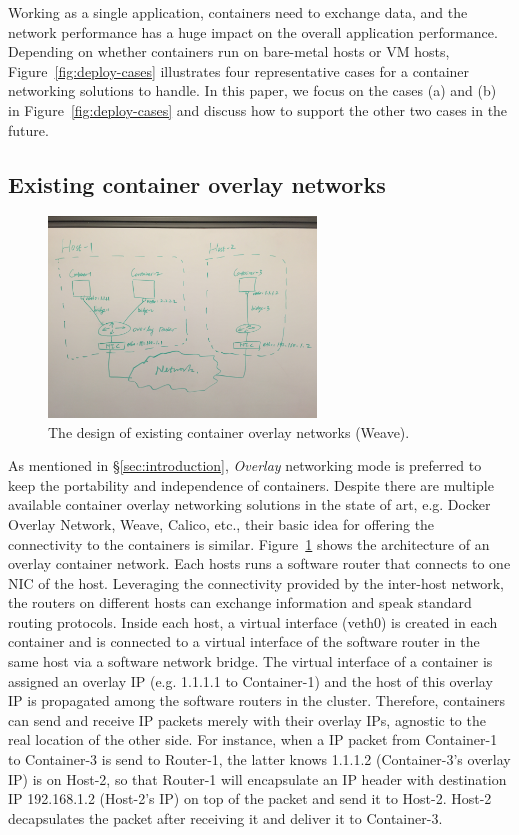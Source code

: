 Working as a single application, containers need to exchange data, and the network performance has a huge impact on the overall application performance.
Depending on whether 
containers run on bare-metal hosts or VM hosts, Figure~\ref{fig:deploy-cases}
illustrates four representative cases for a container networking solutions
to handle. 
In this paper, 
we focus on the cases (a) and (b) in Figure~\ref{fig:deploy-cases} and discuss how to support the other two cases in the future.

\subsection{Existing container overlay networks}

\begin{figure}[h]  
	\centering   
	\includegraphics[width=2.8in]{figures/overlay-sketch}   
	\caption{\label{fig:overlay} The design of existing container overlay networks (Weave).}   
\end{figure}   

As mentioned in \S\ref{sec:introduction}, {\em Overlay} networking mode 
is preferred to keep the portability and independence of containers.
Despite there are multiple available container overlay networking solutions
in the state of art, e.g. Docker Overlay Network, Weave, Calico, etc., 
their basic idea for offering the connectivity to the containers is similar.
Figure~\ref{fig:overlay} shows the architecture of an overlay container network.
Each hosts runs a software router that connects to one NIC of the host. 
Leveraging the connectivity provided by the inter-host network, the routers
on different hosts can exchange information and speak standard routing protocols.
Inside each host, a virtual interface (veth0) is created in each container and is connected to a virtual interface of the software router in the same host via a software network bridge. The virtual interface of a container is assigned
an overlay IP (e.g. 1.1.1.1 to Container-1) and the host of this overlay IP
is propagated among the software routers in the cluster. Therefore, containers
can send and receive IP packets merely with their overlay IPs, agnostic to
the real location of the other side. For instance, when a IP packet from
Container-1 to Container-3 is send to Router-1, the latter knows 1.1.1.2
(Container-3's overlay IP) is on Host-2, so that Router-1 will encapsulate 
an IP header with destination IP 192.168.1.2 (Host-2's IP) on top of the packet
and send it to Host-2. Host-2 decapsulates the packet after receiving it
and deliver it to Container-3.  

